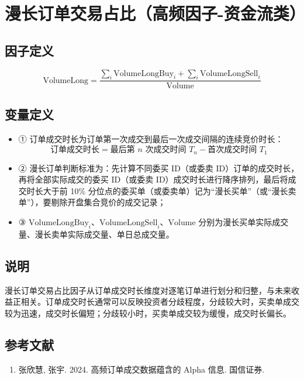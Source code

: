 \documentclass{article}
\begin{document}
\section{漫长订单交易占比（高频因子-资金流类）}

\subsection{因子定义}
\begin{equation}
    \mathrm{VolumeLong} = \frac{\sum_i \mathrm{VolumeLongBuy}_i + \sum_i \mathrm{VolumeLongSell}_i}{\mathrm{Volume}}
\end{equation}

\subsection{变量定义}
\begin{itemize}
    \item ① 订单成交时长为订单第一次成交到最后一次成交间隔的连续竞价时长：
        \begin{equation*}
            \text{订单成交时长} = \text{最后第 } n \text{ 次成交时间 } T_n - \text{首次成交时间 } T_1
        \end{equation*}
    \item ② 漫长订单判断标准为：先计算不同委买 ID（或委卖 ID）订单的成交时长，再将全部实际成交的委买 ID（或委卖 ID）成交时长进行降序排列，最后将成交时长大于前 10\% 分位点的委买单（或委卖单）记为“漫长买单”（或“漫长卖单”），要剔除开盘集合竞价的成交记录；
    \item ③ \( \mathrm{VolumeLongBuy}_i \)、\( \mathrm{VolumeLongSell}_i \)、\( \mathrm{Volume} \) 分别为漫长买单实际成交量、漫长卖单实际成交量、单日总成交量。
\end{itemize}

\subsection{说明}
漫长订单交易占比因子从订单成交时长维度对逐笔订单进行划分和归整，与未来收益正相关。订单成交时长通常可以反映投资者分歧程度，分歧较大时，买卖单成交较为迅速，成交时长偏短；分歧较小时，买卖单成交较为缓慢，成交时长偏长。

\subsection{参考文献}
\begin{enumerate}
    \item 张欣慧, 张宇. 2024. 高频订单成交数据蕴含的 Alpha 信息. 国信证券.
\end{enumerate}
\end{document}
